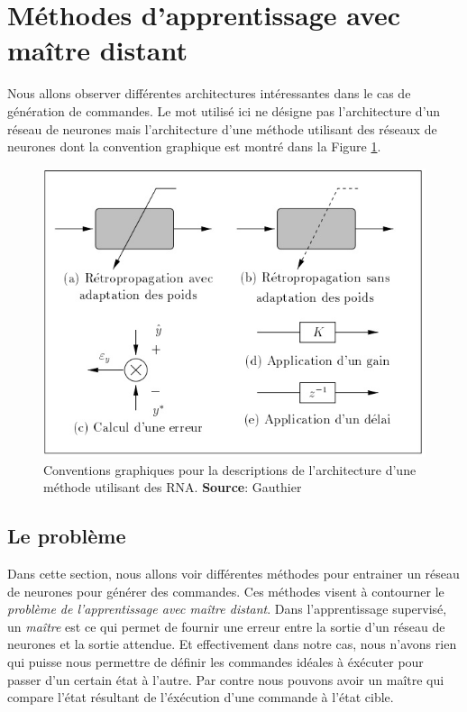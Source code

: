 \section{Méthodes d'apprentissage avec maître distant}
Nous allons observer différentes architectures intéressantes dans le cas de génération de commandes.
Le mot  utilisé ici ne désigne pas l'architecture d'un réseau de neurones mais l'architecture d'une méthode utilisant des réseaux de neurones dont la convention graphique est montré dans la Figure \ref{legendearchi}.
\begin{figure}
 \centering
 \includegraphics[scale=0.6]{../figures/applegende.jpg}
 \caption{Conventions graphiques pour la descriptions de l'architecture d'une méthode utilisant des RNA. \textbf{Source}: Gauthier\cite{Gauthier}}
 \label{legendearchi}
\end{figure}

\subsection{Le problème}
Dans cette section, nous allons voir différentes méthodes pour entrainer un réseau de neurones pour générer des commandes.
Ces méthodes visent à contourner le \emph{problème de l'apprentissage avec maître distant}.
Dans l'apprentissage supervisé, un \emph{maître} est ce qui permet de fournir une erreur entre la sortie d'un réseau de neurones et la sortie attendue.
Et effectivement dans notre cas, nous n'avons rien qui puisse nous permettre de définir les commandes idéales à éxécuter pour passer d'un certain état à l'autre.
Par contre nous pouvons avoir un maître qui compare l'état résultant de l'éxécution d'une commande à l'état cible.


